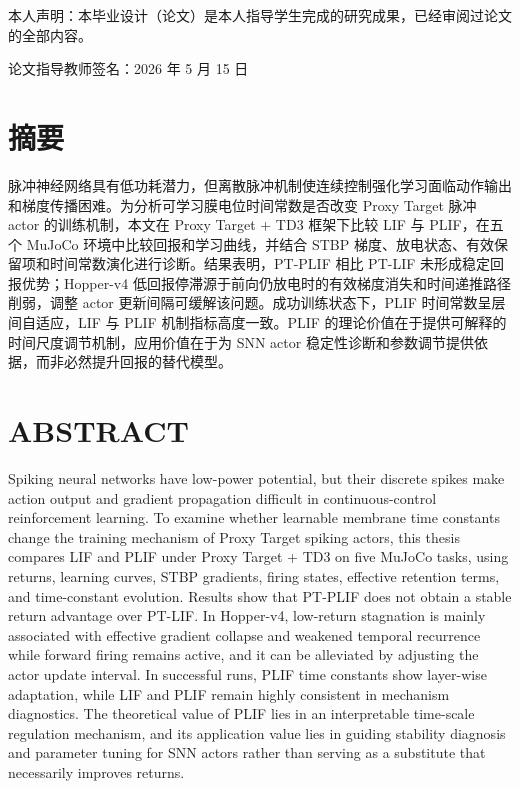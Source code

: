 \documentclass[UTF8,zihao=-4,oneside,openany]{ctexbook}
\begin{document}
\vspace{18mm}
本人声明：本毕业设计（论文）是本人指导学生完成的研究成果，已经审阅过论文的全部内容。

\vspace{18mm}
\noindent 论文指导教师签名：\underline{\makebox[45mm][c]{}}\hfill 2026 年 5 月 15 日

\chapter*{\songti{}\bfseries 摘\quad 要}
脉冲神经网络具有低功耗潜力，但离散脉冲机制使连续控制强化学习面临动作输出和梯度传播困难。为分析可学习膜电位时间常数是否改变 Proxy Target 脉冲 actor 的训练机制，本文在 Proxy Target + TD3 框架下比较 LIF 与 PLIF，在五个 MuJoCo 环境中比较回报和学习曲线，并结合 STBP 梯度、放电状态、有效保留项和时间常数演化进行诊断。结果表明，PT-PLIF 相比 PT-LIF 未形成稳定回报优势；Hopper-v4 低回报停滞源于前向仍放电时的有效梯度消失和时间递推路径削弱，调整 actor 更新间隔可缓解该问题。成功训练状态下，PLIF 时间常数呈层间自适应，LIF 与 PLIF 机制指标高度一致。PLIF 的理论价值在于提供可解释的时间尺度调节机制，应用价值在于为 SNN actor 稳定性诊断和参数调节提供依据，而非必然提升回报的替代模型。


\chapter*{\bfseries ABSTRACT}
Spiking neural networks have low-power potential, but their discrete spikes make action output and gradient propagation difficult in continuous-control reinforcement learning. To examine whether learnable membrane time constants change the training mechanism of Proxy Target spiking actors, this thesis compares LIF and PLIF under Proxy Target + TD3 on five MuJoCo tasks, using returns, learning curves, STBP gradients, firing states, effective retention terms, and time-constant evolution. Results show that PT-PLIF does not obtain a stable return advantage over PT-LIF. In Hopper-v4, low-return stagnation is mainly associated with effective gradient collapse and weakened temporal recurrence while forward firing remains active, and it can be alleviated by adjusting the actor update interval. In successful runs, PLIF time constants show layer-wise adaptation, while LIF and PLIF remain highly consistent in mechanism diagnostics. The theoretical value of PLIF lies in an interpretable time-scale regulation mechanism, and its application value lies in guiding stability diagnosis and parameter tuning for SNN actors rather than serving as a substitute that necessarily improves returns.
\end{document}
